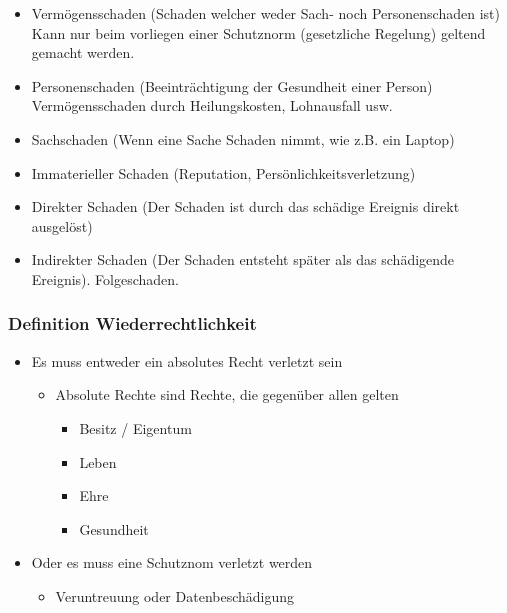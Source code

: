 \begin{itemize}
	\tightlist
	\item Vermögensschaden (Schaden welcher weder Sach- noch Personenschaden ist)\\
	Kann nur beim vorliegen einer Schutznorm (gesetzliche Regelung) geltend
	gemacht werden.
	\item Personenschaden (Beeinträchtigung der Gesundheit einer Person)\\
	Vermögensschaden durch Heilungskosten, Lohnausfall usw.
	\item Sachschaden (Wenn eine Sache Schaden nimmt, wie z.B. ein Laptop)
	\item Immaterieller Schaden (Reputation, Persönlichkeitsverletzung)
	\item Direkter Schaden (Der Schaden ist durch das schädige Ereignis direkt
	ausgelöst)
	\item Indirekter Schaden (Der Schaden entsteht später als das schädigende
	Ereignis). Folgeschaden.
\end{itemize}


\subsubsection{Definition Wiederrechtlichkeit}

\begin{itemize}
	\tightlist
	\item Es muss entweder ein absolutes Recht verletzt sein
	\begin{itemize}
		\tightlist
		\item Absolute Rechte sind Rechte, die gegenüber allen gelten
		\begin{itemize}
			\tightlist
			\item Besitz / Eigentum
			\item Leben
			\item Ehre
			\item Gesundheit
		\end{itemize}
	\end{itemize}
	\item Oder es muss eine Schutznom verletzt werden
	\begin{itemize}
		\tightlist
		\item Veruntreuung oder Datenbeschädigung
	\end{itemize}
\end{itemize}


